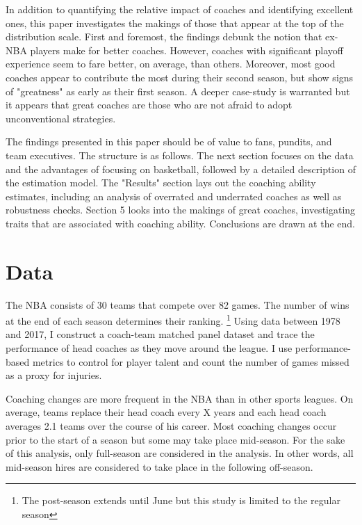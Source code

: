 \documentclass[main.tex]{subfiles}
\begin{document}
In addition to quantifying the relative impact of coaches and identifying excellent ones, this paper investigates the makings of those that appear at the top of the distribution scale. First and foremost, the findings debunk the notion that ex-NBA players make for better coaches. However, coaches with significant playoff experience seem to fare better, on average, than others. Moreover, most good coaches appear to contribute the most during their second season, but show signs of "greatness" as early as their first season. A deeper case-study is warranted but it appears that great coaches are those who are not afraid to adopt unconventional strategies. 

The findings presented in this paper should be of value to fans, pundits, and team executives. The structure is as follows. The next section focuses on the data and the advantages of focusing on basketball, followed by a detailed description of the estimation model. The "Results" section lays out the coaching ability estimates, including an analysis of overrated and underrated coaches as well as robustness checks. Section 5 looks into the makings of great coaches, investigating traits that are associated with coaching ability. Conclusions are drawn at the end. 

\section{Data}

The NBA consists of 30 teams that compete over 82 games. The number of wins at the end of each season determines their ranking. \footnote{The post-season extends until June but this study is limited to the regular season} Using data between 1978 and 2017, I construct a coach-team matched panel dataset and trace the performance of head coaches as they move around the league. I use performance-based metrics to control for player talent and count the number of games missed as a proxy for injuries.

Coaching changes are more frequent in the NBA than in other sports leagues. On average, teams replace their head coach every X years and each head coach averages 2.1 teams over the course of his career. Most coaching changes occur prior to the start of a season but some may take place mid-season. For the sake of this analysis, only full-season are considered in the analysis. In other words, all mid-season hires are considered to take place in the following off-season. 
\end{document}
